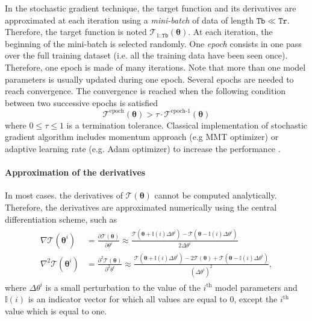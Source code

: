 In the stochastic gradient technique, the target function and its derivatives are approximated at each iteration using a \emph{mini-batch} of data of length $\mathtt{Tb} \ll \mathtt{Tr}$.
Therefore, the target function is noted $\mathcal{T}_{1:\mathtt{Tb}}(\bm{\theta})$.
At each iteration, the beginning of the mini-batch is selected randomly.
One \emph{epoch} consists in one pass over the full training dataset (i.e. all the training data have been seen once).
Therefore, one epoch is made of many iterations.
Note that more than one model parameters is usually updated during one epoch.
Several epochs are needed to reach convergence.
The convergence is reached when the following condition between two successive epochs is satisfied 
\begin{equation}
\mathcal{T}^{\text{epoch}} (\bm\theta) > \tau  \cdot \mathcal{T}^{\text{epoch-1}} (\bm\theta)
\label{EQ:SGT}
\end{equation}
where $0 \le \tau \le 1$ is a termination tolerance.
Classical implementation of stochastic gradient algorithm includes momentum approach (e.g MMT optimizer) or adaptive learning rate (e.g. Adam optimizer) to increase the performance \cite{Goodfellow-et-al-2016}.  

\paragraph{Approximation of the derivatives}

In most cases. the derivatives of $\mathcal{T}(\bm{\theta})$ cannot be computed analytically.
Therefore, the derivatives are approximated numerically using the central differentiation scheme, such as
\begin{gather}
\begin{aligned}
 \nabla \mathcal{T}(\bm\theta^{i}) & = \frac{\partial \mathcal{T} (\bm\theta) }{\partial \theta^{i}} \approx \frac{\mathcal{T} (\bm\theta + \mathbb{I}(i)\Delta \theta^{i} )  -  \mathcal{T} (\bm\theta - \mathbb{I}(i)\Delta \theta^{i} ) }{2\Delta \theta^{i}}  \\
 \nabla^{2} \mathcal{T}(\bm\theta^{i}) & = \frac{\partial^{2} \mathcal{T} (\bm\theta) }{\partial^{2} \theta^{i}} \approx \frac{\mathcal{T} (\bm\theta + \mathbb{I}(i)\Delta \theta^{i} )  -  2 \mathcal{T} (\bm\theta) +  \mathcal{T} (\bm\theta - \mathbb{I}(i)\Delta \theta^{i} ) }{(\Delta \theta^{i})^{2}},
\label{EQ:numericaldiff}
\end{aligned}
\end{gather}
where $\Delta \theta^{i}$ is a small perturbation to the value of the $i^{\text{th}}$ model parameters and $\mathbb{I}(i)$ is an indicator vector for which all values are equal to $0$, except the $i^{\text{th}}$ value which is equal to one.


